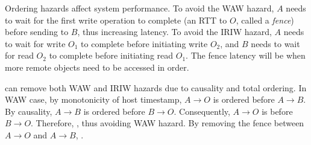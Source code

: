 

Ordering hazards affect system performance. To avoid the WAW hazard, $A$ needs to wait for the first write operation to complete (an RTT to $O$, called a \emph{fence}) before sending to $B$, thus increasing latency. To avoid the IRIW hazard, $A$ needs to wait for write $O_1$ to complete before initiating write $O_2$, and $B$ needs to wait for read $O_2$ to complete before initiating read $O_1$. The fence latency will be  when more remote objects need to be accessed in order.


\sys{} can remove both WAW and IRIW hazards due to causality and total ordering.
In WAW case, by monotonicity of host timestamp, $A \rightarrow O$ is ordered before $A \rightarrow B$. By causality, $A \rightarrow B$ is ordered before $B \rightarrow O$. Consequently, $A \rightarrow O$ is  before $B \rightarrow O$. Therefore, , thus avoiding WAW hazard.
By removing the fence between $A \rightarrow O$ and $A \rightarrow B$, .

